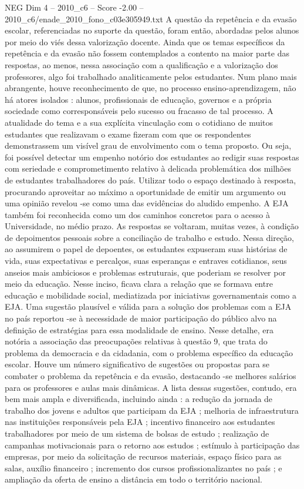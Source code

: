 \begin{textsample}{NEG Dim 4 – 2010\_c6 – Score -2.00 – 2010\_c6/enade\_2010\_fono\_c03e305949.txt}
A questão da repetência e da evasão escolar, referenciadas no suporte da questão, foram então, abordadas pelos alunos por meio do viés dessa valorização docente.
Ainda que os temas específicos da repetência e da evasão não fossem contemplados a contento na maior parte das respostas, ao menos, nessa associação com a qualificação e a valorização dos professores, algo foi trabalhado analiticamente pelos estudantes.
Num plano mais abrangente, houve reconhecimento de que, no processo ensino-aprendizagem, não há atores isolados : alunos, profissionais de educação, governos e a própria sociedade como corresponsáveis pelo sucesso ou fracasso de tal processo.
A atualidade do tema e a sua explícita vinculação com o cotidiano de muitos estudantes que realizavam o exame fizeram com que os respondentes demonstrassem um visível grau de envolvimento com o tema proposto.
Ou seja, foi possível detectar um empenho notório dos estudantes ao redigir suas respostas com seriedade e comprometimento relativo à delicada problemática dos milhões de estudantes trabalhadores do país.
Utilizar todo o espaço destinado à resposta, procurando aproveitar ao máximo a oportunidade de emitir um argumento ou uma opinião revelou -se como uma das evidências do aludido empenho.
A EJA também foi reconhecida como um dos caminhos concretos para o acesso à Universidade, no médio prazo.
As respostas se voltaram, muitas vezes, à condição de depoimentos pessoais sobre a conciliação de trabalho e estudo.
Nessa direção, ao assumirem o papel de depoentes, os estudantes expuseram suas histórias de vida, suas expectativas e percalços, suas esperanças e entraves cotidianos, seus anseios mais ambiciosos e problemas estruturais, que poderiam se resolver por meio da educação.
Nesse inciso, ficava clara a relação que se formava entre educação e mobilidade social, mediatizada por iniciativas governamentais como a EJA.
Uma sugestão plausível e válida para a solução dos problemas com a EJA no país reportou -se à necessidade de maior participação do público alvo na definição de estratégias para essa modalidade de ensino.
Nesse detalhe, era notória a associação das preocupações relativas à questão 9, que trata do problema da democracia e da cidadania, com o problema específico da educação escolar.
Houve um número significativo de sugestões ou propostas para se combater o problema da repetência e da evasão, destacando -se melhores salários para os professores e aulas mais dinâmicas.
A lista dessas sugestões, contudo, era bem mais ampla e diversificada, incluindo ainda : a redução da jornada de trabalho dos jovens e adultos que participam da EJA ; melhoria de infraestrutura nas instituições responsáveis pela EJA ; incentivo financeiro aos estudantes trabalhadores por meio de um sistema de bolsas de estudo ; realização de campanhas motivacionais para o retorno aos estudos ; estímulo à participação das empresas, por meio da solicitação de recursos materiais, espaço físico para as salas, auxílio financeiro ; incremento dos cursos profissionalizantes no país ; e ampliação da oferta de ensino a distância em todo o território nacional.

\end{textsample}
